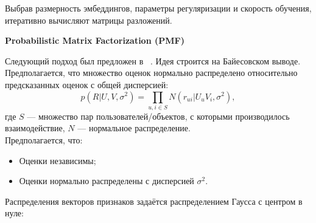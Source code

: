 Выбрав размерность эмбеддингов, параметры регуляризации и скорость обучения, итеративно вычисляют матрицы разложений.

\vspace{1em}
\textbf{Probabilistic Matrix Factorization (PMF)}

Следующий подход был предложен в ~\cite{pmf}.
Идея строится на Байесовском выводе.
Предполагается, что множество оценок нормально распределено относительно предсказанных оценок с общей дисперсией:
\begin{equation}\label{eq:ratings-distr}
        p(R|U, V, \sigma^2) = \prod_{u, i \in S}{N(r_{ui}|U_{u}V_{i}, \sigma^2)},
\end{equation}
где $S$ --- множество пар пользователей/объектов, с которыми производилось взаимодействие,
$N$ --- нормальное распределение.\\
Предполагается, что:
\begin{itemize}
\item Оценки независимы;
\item Оценки нормально распределены с дисперсией $\sigma^2$.
\end{itemize}
Распределения векторов признаков задаётся распределением Гаусса с центром в нуле:

